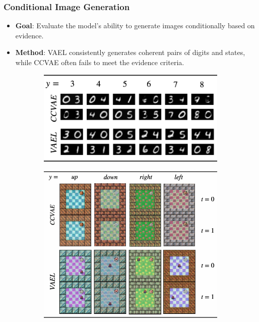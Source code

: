 \documentclass[10pt,xcolor={dvipsnames}]{beamer}
\begin{document}
\begin{frame}[t]
    \frametitle{Conditional Image Generation}
    \begin{itemize}
        \item \textbf{Goal}: Evaluate the model's ability to generate images conditionally based on evidence.
        \item \textbf{Method}: VAEL consistently generates coherent pairs of digits and states, while CCVAE often fails to meet the evidence criteria.
    \end{itemize}
    \begin{figure}[htb]
        \centering
        \begin{subfigure}[][0pt][t]{0.45\textwidth}
            \includegraphics[width=\textwidth]{figures/cond-gen.png}
        \end{subfigure}
        \hfill
        \begin{subfigure}[][0pt][t]{0.5\textwidth}
            \includegraphics[width=\textwidth]{figures/cond-gen2.png}
        \end{subfigure}
    \end{figure}
\end{frame}
\end{document}
